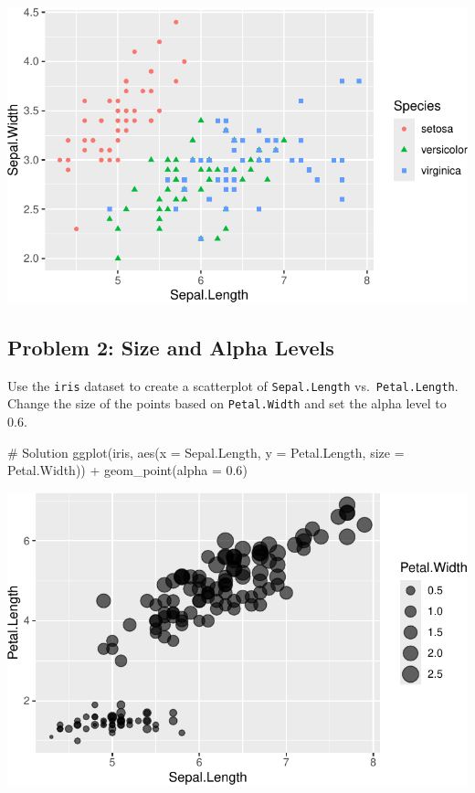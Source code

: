\documentclass[
  letterpaper,
  DIV=11,
  numbers=noendperiod]{scrreprt}
\newenvironment{Shaded}{\begin{snugshade}}{\end{snugshade}}
\newcommand{\AttributeTok}[1]{\textcolor[rgb]{0.40,0.45,0.13}{#1}}
\newcommand{\CommentTok}[1]{\textcolor[rgb]{0.37,0.37,0.37}{#1}}
\newcommand{\FloatTok}[1]{\textcolor[rgb]{0.68,0.00,0.00}{#1}}
\newcommand{\FunctionTok}[1]{\textcolor[rgb]{0.28,0.35,0.67}{#1}}
\newcommand{\NormalTok}[1]{\textcolor[rgb]{0.00,0.23,0.31}{#1}}
\newcommand{\SpecialCharTok}[1]{\textcolor[rgb]{0.37,0.37,0.37}{#1}}
\begin{document}
\includegraphics{Advanced_Scatterplot_Techniques_files/figure-pdf/unnamed-chunk-20-1.pdf}

\subsection*{Problem 2: Size and Alpha
Levels}\label{problem-2-size-and-alpha-levels}

Use the \texttt{iris} dataset to create a scatterplot of
\texttt{Sepal.Length} vs.~\texttt{Petal.Length}. Change the size of the
points based on \texttt{Petal.Width} and set the alpha level to 0.6.

\begin{Shaded}
\begin{Highlighting}[]
\CommentTok{\# Solution}
\FunctionTok{ggplot}\NormalTok{(iris, }\FunctionTok{aes}\NormalTok{(}\AttributeTok{x =}\NormalTok{ Sepal.Length, }\AttributeTok{y =}\NormalTok{ Petal.Length, }\AttributeTok{size =}\NormalTok{ Petal.Width)) }\SpecialCharTok{+}
  \FunctionTok{geom\_point}\NormalTok{(}\AttributeTok{alpha =} \FloatTok{0.6}\NormalTok{)}
\end{Highlighting}
\end{Shaded}

\includegraphics{Advanced_Scatterplot_Techniques_files/figure-pdf/unnamed-chunk-21-1.pdf}
\end{document}
